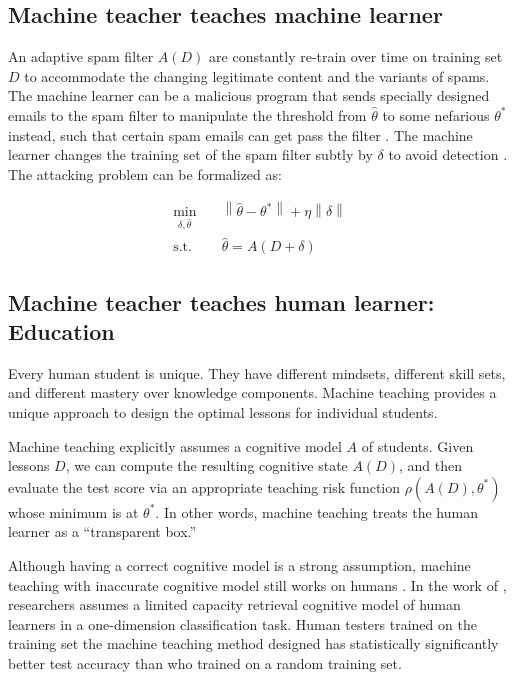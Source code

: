     \subsection{Machine teacher teaches machine learner}

        An adaptive spam filter $A(D)$ are constantly re-train over time on training set $D$ to accommodate
        the changing legitimate content and the variants of spams.
        The machine learner can be a malicious program that sends specially designed emails
        to the spam filter to manipulate the threshold from $\hat{\theta}$ to some nefarious $\theta^*$ instead,
        such that certain spam emails can get pass the filter \cite{Alfeld2016}.
        The machine learner changes the training set of the spam filter subtly by $\delta$ to avoid detection \cite{Mei2015}.
        The attacking problem can be formalized as:

        \begin{equation*}
        \begin{aligned}
            \min_{\delta, \hat{\theta}} \quad &
            \left\lVert\hat{\theta} - \theta^*\right\rVert + \eta \left\lVert\delta\right\rVert \\
            \textrm{s.t.} \quad & \hat{\theta} = A(D+\delta)
        \end{aligned}
        \end{equation*}

    \subsection{Machine teacher teaches human learner: Education}

        Every human student is unique.
        They have different mindsets, different skill sets, and different mastery over knowledge components.
        Machine teaching provides a unique approach to design the optimal lessons for individual students.

        Machine teaching explicitly assumes a cognitive model $A$ of students.
        Given lessons $D$, we can compute the resulting cognitive state $A(D)$,
        and then evaluate the test score via an appropriate teaching risk function $\rho(A(D), \theta^*)$
        whose minimum is at $\theta^*$.
        In other words, machine teaching treats the human learner as a ``transparent box.''

        Although having a correct cognitive model is a strong assumption,
        machine teaching with inaccurate cognitive model still works on humans \cite{Whitehill2017}.
        In the work of \cite{Patil2014},
        researchers assumes a limited capacity retrieval cognitive model of human learners
        in a one-dimension classification task.
        Human testers trained on the training set the machine teaching method designed
        has statistically significantly better test accuracy than who trained on a random training set.














